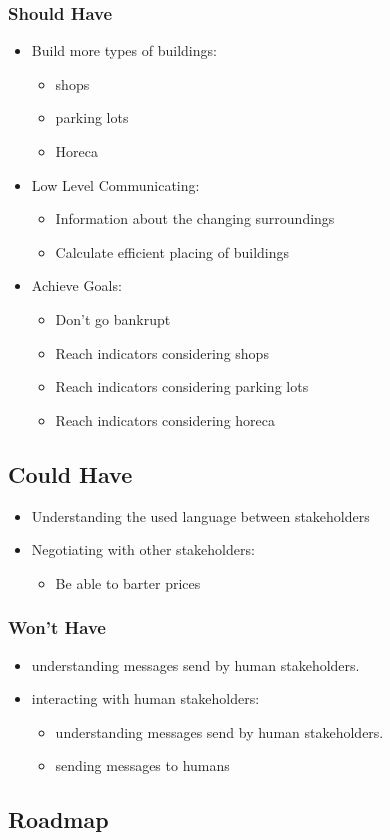 \subsubsection{Should Have}
\begin{itemize}
	\item Build more types of buildings:
	\begin{itemize}
		\item shops
		\item parking lots
		\item Horeca
	\end{itemize}
	\item Low Level Communicating:
	\begin{itemize}
		\item Information about the changing surroundings
		\item Calculate efficient placing of buildings
	\end{itemize}
	\item Achieve Goals:
	\begin{itemize}
		\item Don’t go bankrupt
		\item Reach indicators considering shops
		\item Reach indicators considering parking lots
		\item Reach indicators considering horeca
	\end{itemize}
\end{itemize}

\subsection{Could Have}
\begin{itemize}
	\item Understanding the used language between stakeholders
	\item Negotiating with other stakeholders:
	\begin{itemize}
		\item Be able to barter prices
	\end{itemize}
\end{itemize}

\subsubsection{Won’t Have}
\begin{itemize}
	\item understanding messages send by human stakeholders.
	\item interacting with human stakeholders:
	\begin{itemize}
		\item understanding messages send by human stakeholders.
		\item sending messages to humans
	\end{itemize}
\end{itemize}

\subsection{Roadmap}
\newpage
